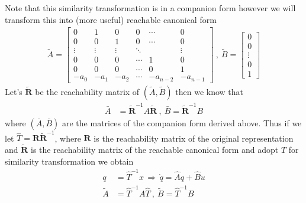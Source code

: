 \documentclass[twoside]{article}
\begin{document}
%
Note that this similarity transformation is in a companion form however we will transform this into (more useful) 
reachable canonical form
%
\begin{align*}
\tilde{A} =  \left[ \begin{array}{c|c|c|c|c|c} 
0 & 1 & 0 & 0 & \cdots & 0 \\
0 & 0 & 1 &  0 & \cdots & 0 \\
\vdots & \vdots & \vdots & \ddots &  & \vdots \\
0 & 0 & 0 & \cdots  & 1 & 0 \\
0 & 0 & 0 & \cdots  & 0 & 1 \\
-a_{0} & -a_{1} & -a_{2} & \cdots  & -a_{n-2} & -a_{n-1} 
\end{array} 
\right] 
\ , \ \tilde{B} = \begin{bmatrix} 0 \\ 0 \\ \vdots \\ 0 \\ 1 \end{bmatrix}
\end{align*}
%
Let's $\tilde{\mathbf{R}}$ be the reachability matrix of $(\tilde{A} , \tilde{B})$ then we know that 
%
%
\begin{align*}
	\bar{A} &= \tilde{\mathbf{R}}^{-1} A \tilde{\mathbf{R}} \ , \ \bar{B} = \tilde{\mathbf{R}}^{-1} B 
\end{align*}
%
where $(\bar{A},\bar{B})$ are the matrices of the companion form derived above. Thus if we let 
$\hat{T} = \mathbf{R} \tilde{\mathbf{R}}^{-1}$, where $\mathbf{R}$ is the reachability matrix of the
original representation and $\tilde{\mathbf{R}}$ is the reachability matrix of the reachable
canonical form and adopt $T$ for similarity transformation we obtain
%
\begin{align*}
	q &= \hat{T}^{-1} x \, \Rightarrow \, \dot{q} = \hat{A} q + \hat{B} u \\
	\tilde{A} &= \hat{T}^{-1} A \hat{T} \ , \ \tilde{B} = \hat{T}^{-1} B 
\end{align*}
%




\end{document}
